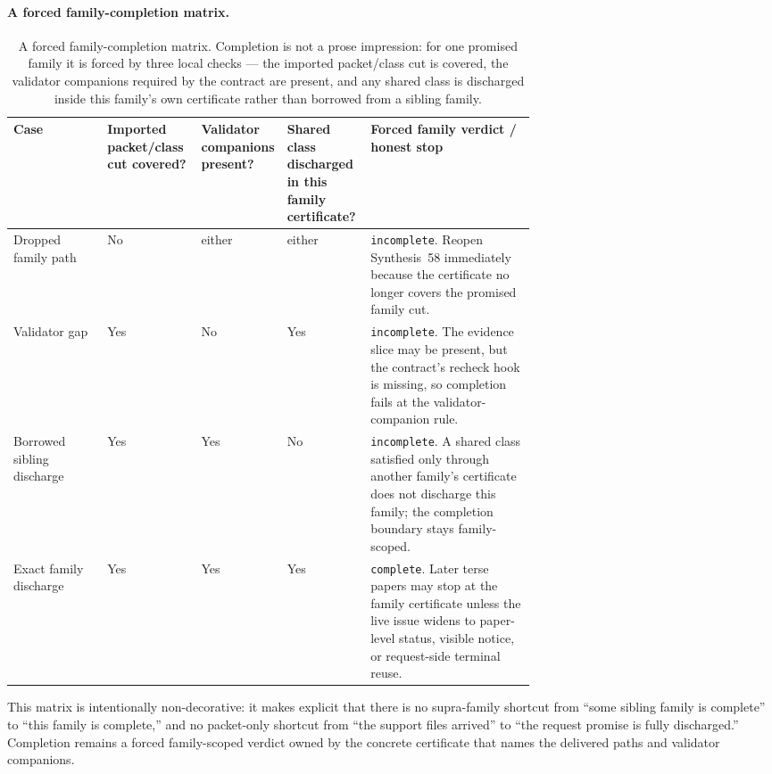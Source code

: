 \documentclass[11pt]{article}
\begin{document}
\paragraph{A forced family-completion matrix.}
\begin{table}[t]
\centering
\footnotesize
\begin{tabularx}{\linewidth}{@{}p{0.18\linewidth}p{0.18\linewidth}p{0.16\linewidth}p{0.16\linewidth}X@{}}
\toprule
Case & Imported packet/class cut covered? & Validator companions present? & Shared class discharged in this family certificate? & Forced family verdict / honest stop \\
\midrule
Dropped family path & No & either & either & \texttt{incomplete}. Reopen Synthesis~58 immediately because the certificate no longer covers the promised family cut. \\
Validator gap & Yes & No & Yes & \texttt{incomplete}. The evidence slice may be present, but the contract's recheck hook is missing, so completion fails at the validator-companion rule. \\
Borrowed sibling discharge & Yes & Yes & No & \texttt{incomplete}. A shared class satisfied only through another family's certificate does not discharge this family; the completion boundary stays family-scoped. \\
Exact family discharge & Yes & Yes & Yes & \texttt{complete}. Later terse papers may stop at the family certificate unless the live issue widens to paper-level status, visible notice, or request-side terminal reuse. \\
\bottomrule
\end{tabularx}
\caption{A forced family-completion matrix. Completion is not a prose impression: for one promised family it is forced by three local checks --- the imported packet/class cut is covered, the validator companions required by the contract are present, and any shared class is discharged inside this family's own certificate rather than borrowed from a sibling family.}
\label{tab:forced-family-completion-matrix}
\end{table}

This matrix is intentionally non-decorative: it makes explicit that there is no supra-family shortcut from ``some sibling family is complete'' to ``this family is complete,'' and no packet-only shortcut from ``the support files arrived'' to ``the request promise is fully discharged.'' Completion remains a forced family-scoped verdict owned by the concrete certificate that names the delivered paths and validator companions.\cite{series:workedexample}
\end{document}

